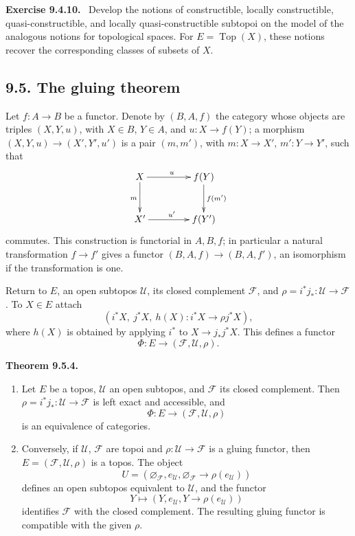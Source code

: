 \documentclass[11pt]{article}
\newcommand{\Uu}{\mathcal{U}}
\newcommand{\Ff}{\mathcal{F}}
\newcommand{\Top}{\operatorname{Top}}
\newenvironment{statement}[1]{\par\medskip\noindent\textbf{#1.}\ }{\par\medskip}
\newenvironment{remarktext}[1]{\par\medskip\noindent\textbf{#1.}\ }{\par\medskip}
\begin{document}
\begin{remarktext}{Exercise 9.4.10}
Develop the notions of constructible, locally constructible, quasi-constructible, and locally quasi-constructible subtopoi on the model of the analogous notions for topological spaces. For \(E=\Top(X)\), these notions recover the corresponding classes of subsets of \(X\).
\end{remarktext}

\subsection*{9.5. The gluing theorem}

Let \(f:A\to B\) be a functor. Denote by \((B,A,f)\) the category whose objects are triples \((X,Y,u)\), with \(X\in B\), \(Y\in A\), and \(u:X\to f(Y)\); a morphism \((X,Y,u)\to(X',Y',u')\) is a pair \((m,m')\), with \(m:X\to X'\), \(m':Y\to Y'\), such that
\[
\xymatrix@C=1.5cm@R=1cm{
X\ar[r]^u\ar[d]_m&f(Y)\ar[d]^{f(m')}\\
X'\ar[r]^{u'}&f(Y')
}
\]
commutes. This construction is functorial in \(A,B,f\); in particular a natural transformation \(f\to f'\) gives a functor \((B,A,f)\to(B,A,f')\), an isomorphism if the transformation is one.

Return to \(E\), an open subtopos \(\Uu\), its closed complement \(\Ff\), and \(\rho=i^*j_*:\Uu\to\Ff\). To \(X\in E\) attach
\[
(i^*X,\ j^*X,\ h(X):i^*X\to \rho j^*X),
\]
where \(h(X)\) is obtained by applying \(i^*\) to \(X\to j_*j^*X\). This defines a functor
\[
\Phi:E\longrightarrow(\Ff,\Uu,\rho).
\tag{9.5.3.1}
\]

\begin{statement}{Theorem 9.5.4}
\begin{enumerate}[label=\alph*)]
\item Let \(E\) be a topos, \(\Uu\) an open subtopos, and \(\Ff\) its closed complement. Then \(\rho=i^*j_*:\Uu\to\Ff\) is left exact and accessible, and
\[
\Phi:E\longrightarrow(\Ff,\Uu,\rho)
\]
is an equivalence of categories.
\item Conversely, if \(\Uu\), \(\Ff\) are topoi and \(\rho:\Uu\to\Ff\) is a gluing functor, then \(E=(\Ff,\Uu,\rho)\) is a topos. The object
\[
U=(\varnothing_\Ff,e_\Uu,\varnothing_\Ff\to\rho(e_\Uu))
\]
defines an open subtopos equivalent to \(\Uu\), and the functor
\[
Y\longmapsto (Y,e_\Uu,Y\to\rho(e_\Uu))
\]
identifies \(\Ff\) with the closed complement. The resulting gluing functor is compatible with the given \(\rho\).
\end{enumerate}
\end{statement}
\end{document}
